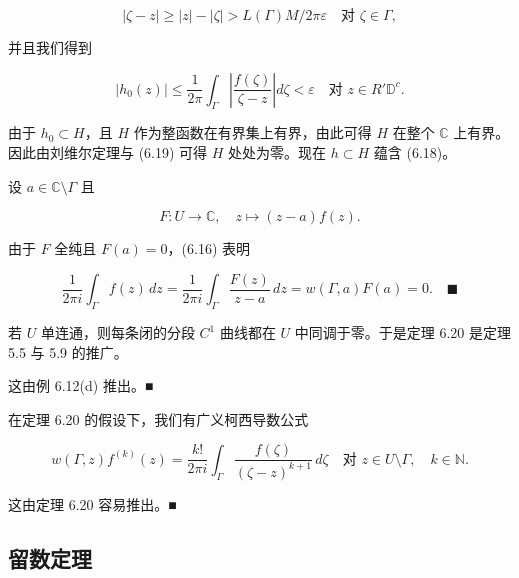 \begin{theorem}
\begin{subitems}
\[
|\zeta - z| \ge |z| - |\zeta| > L(\Gamma)M/2\pi\varepsilon \quad \text{对 } \zeta \in \Gamma ,
\]

并且我们得到

\begin{equation}
|h_{0}(z)| \le \frac{1}{2\pi}\int_{\Gamma}\left|\frac{f(\zeta)}{\zeta - z}\right|d\zeta < \varepsilon \quad \text{对 } z \in R'\mathbb{D}^{c} .\tag{6.19}
\end{equation}

由于 $ h_{0} \subset H $，且 $ H $ 作为整函数在有界集上有界，由此可得 $ H $ 在整个 $ \mathbb{C} $ 上有界。因此由刘维尔定理与 (6.19) 可得 $ H $ 处处为零。现在 $ h \subset H $ 蕴含 (6.18)。

\item

设 $ a \in \mathbb{C}\setminus\Gamma $ 且

\[
F : U \to \mathbb{C} , \quad z \mapsto (z - a)f(z) .
\]

由于 $ F $ 全纯且 $ F(a) = 0 $，(6.16) 表明

\[
\frac{1}{2\pi i}\int_{\Gamma}f(z)\,dz = \frac{1}{2\pi i}\int_{\Gamma}\frac{F(z)}{z - a}\,dz = w(\Gamma,a)F(a) = 0 .\quad\blacksquare
\]
\end{subitems}

\end{theorem}

\begin{remark}

\begin{items}
\item

若 $ U $ 单连通，则每条闭的分段 $ C^{1} $ 曲线都在 $ U $ 中同调于零。于是定理 6.20 是定理 5.5 与 5.9 的推广。

\proofhead
这由例 6.12(d) 推出。\nobreak\hspace{0.35em}■
\item

在定理 6.20 的假设下，我们有广义柯西导数公式

\[
w(\Gamma,z)f^{(k)}(z) = \frac{k!}{2\pi i}\int_{\Gamma}\frac{f(\zeta)}{(\zeta - z)^{k+1}}\,d\zeta \quad \text{对 } z \in U\setminus\Gamma , \quad k \in \mathbb{N} .
\]

\proofhead
这由定理 6.20 容易推出。\nobreak\hspace{0.35em}■
\end{items}

\end{remark}

\subsection*{留数定理}

